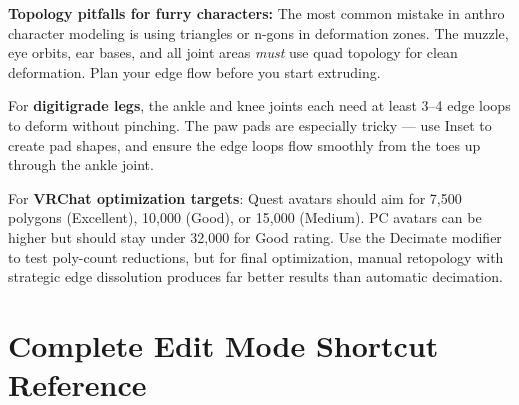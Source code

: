 \begin{furrybox}
\textbf{Topology pitfalls for furry characters:} The most common mistake in anthro character modeling is using triangles or n-gons in deformation zones. The muzzle, eye orbits, ear bases, and all joint areas \textit{must} use quad topology for clean deformation. Plan your edge flow before you start extruding.

For \textbf{digitigrade legs}, the ankle and knee joints each need at least 3--4 edge loops to deform without pinching. The paw pads are especially tricky --- use Inset to create pad shapes, and ensure the edge loops flow smoothly from the toes up through the ankle joint.

For \textbf{VRChat optimization targets}: Quest avatars should aim for 7,500 polygons (Excellent), 10,000 (Good), or 15,000 (Medium). PC avatars can be higher but should stay under 32,000 for Good rating. Use the Decimate modifier to test poly-count reductions, but for final optimization, manual retopology with strategic edge dissolution produces far better results than automatic decimation.
\end{furrybox}



\section{Complete Edit Mode Shortcut Reference}
\label{sec:editshortcuts}

